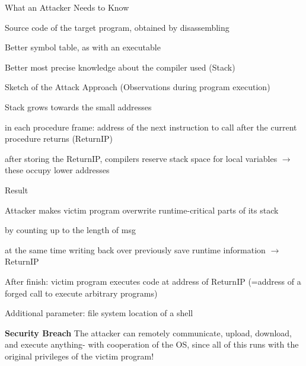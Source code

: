 \documentclass[a4paper]{article}
\renewcommand{\note}[2]{\begin{noteBox} \textbf{#1} #2 \end{noteBox}}
\begin{document}
\begin{multicols}{3}
    What an Attacker Needs to Know
    \begin{itemize*}
        \item Source code of the target program, obtained by disassembling
        \item Better symbol table, as with an executable
        \item Better most precise knowledge about the compiler used (Stack)
    \end{itemize*}
    Sketch of the Attack Approach (Observations during program execution)
    \begin{itemize*}
        \item Stack grows towards the small addresses
        \item in each procedure frame: address of the next instruction to call after the current procedure returns (ReturnIP)
        \item after storing the ReturnIP, compilers reserve stack space for local variables $\rightarrow$ these occupy lower addresses
    \end{itemize*}
    Result
    \begin{itemize*}
        \item Attacker makes victim program overwrite runtime-critical parts of its stack
        \begin{itemize*}
            \item by counting up to the length of msg
            \item at the same time writing back over previously save runtime information $\rightarrow$ ReturnIP
        \end{itemize*}
        \item After finish: victim program executes code at address of ReturnIP (=address of a forged call to execute arbitrary programs)
        \item Additional parameter: file system location of a shell
    \end{itemize*}

    \note{Security Breach}{The attacker can remotely communicate, upload, download, and execute anything- with cooperation of the OS, since all of this runs with the original privileges of the victim program!}


\end{multicols}
\end{document}
